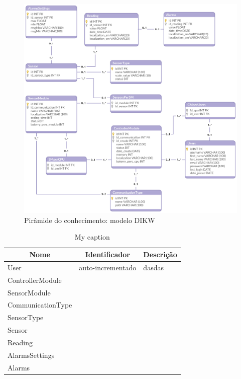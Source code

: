 \begin{figure}[!htb]
	\centering
	\includegraphics[scale=0.25]{esquemas/database_tese.pdf}
	\caption{Pirâmide do conhecimento: modelo DIKW}
	\label{db}
\end{figure}




\begin{table}[h]
	\centering
	\begin{tabular}{|l|l|l|}
		\hline
		\multicolumn{1}{|c|}{\textbf{Nome}} & \multicolumn{1}{c|}{\textbf{Identificador}} & \multicolumn{1}{c|}{\textbf{Descrição}} \\ \hline
		User & auto-incrementado & dasdas \\ \hline
		ControllerModule&  &  \\ \hline
		SensorModule&  &  \\ \hline
		CommunicationType&  &  \\ \hline
		SensorType&  &  \\ \hline
		Sensor&  &  \\ \hline
		Reading&  &  \\ \hline
		AlarmsSettings&  &  \\ \hline
		Alarms&  &  \\ \hline
	\end{tabular}
	\caption{My caption}
	\label{my-label}
\end{table}







